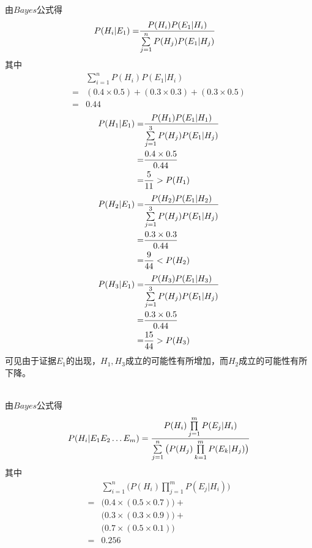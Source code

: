 \begin{answer}
\ 
\begin{subanswer}
    \ \\
    由$Bayes$公式得
    \begin{align}
    P(H_i|E_1)=& \frac{P(H_i)P(E_1|H_i)} {\sum\limits_{j=1}^{n} P(H_j)P(E_1|H_j)}
    \end{align}
    其中
    \begin{align*}
    &\sum\limits_{i=1}^{n}P(H_i)P(E_1|H_i) \\ 
    =& (0.4 \times 0.5) + (0.3 \times 0.3) + (0.3 \times 0.5) \\
    =& 0.44
    \end{align*}
    \begin{align}
    P(H_1|E_1)=& \frac{P(H_1)P(E_1|H_1)} {\sum\limits_{j=1}^{3} P(H_j)P(E_1|H_j)} \notag\\
    =&\frac{0.4 \times 0.5}{0.44} \notag\\
    =&\frac{5}{11} > P(H_1)
    \end{align}
    \begin{align}
    P(H_2|E_1)=& \frac{P(H_2)P(E_1|H_2)} {\sum\limits_{j=1}^{3} P(H_j)P(E_1|H_j)} \notag\\
    =&\frac{0.3 \times 0.3}{0.44} \notag\\
    =&\frac{9}{44} < P(H_2)
    \end{align}
    \begin{align}
    P(H_3|E_1)=& \frac{P(H_3)P(E_1|H_3)} {\sum\limits_{j=1}^{3} P(H_j)P(E_1|H_j)} \notag\\
    =&\frac{0.3 \times 0.5}{0.44} \notag\\
    =&\frac{15}{44} > P(H_3)
    \end{align}
    可见由于证据$E_1$的出现，$H_1,H_3$成立的可能性有所增加，而$H_2$成立的可能性有所下降。
\end{subanswer}
\begin{subanswer}
    \ \\
    由$Bayes$公式得
    \begin{align}
    P(H_i|E_1E_2\dots E_m)= \frac{P(H_i)\prod\limits_{j=1}^{m}P(E_j|H_i)} {\sum\limits_{j=1}^{n}\big(P(H_j)\prod\limits_{k=1}^{m}P(E_k|H_j)\big)}
    \end{align}
    其中
    \begin{align*}
    &\sum\limits_{i=1}^{n}\big(P(H_i)\prod\limits_{j=1}^{m}P(E_j|H_i)\big) \\
    =&\big(0.4 \times (0.5 \times 0.7)\big)+ \\
    &\big(0.3 \times (0.3 \times 0.9)\big)+ \\
    &\big(0.7 \times (0.5 \times 0.1)\big) \\
    =&0.256
    \end{align*}
    \begin{align}

\end{align}
\end{subanswer}
\end{answer}
